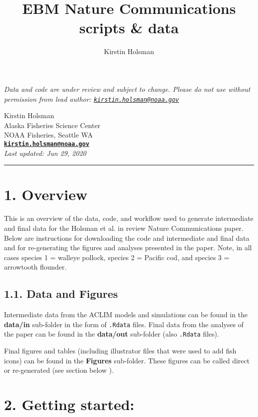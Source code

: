 \documentclass[]{article}
\title{EBM Nature Communications scripts \& data}
\author{Kirstin Holsman}
\date{}
\begin{document}
\maketitle

\emph{Data and code are under review and subject to change. Please do
not use without permission from lead author:
\href{mailto:kirstin.holsman@noaa.gov}{\nolinkurl{kirstin.holsman@noaa.gov}}}

Kirstin Holsman\\
Alaska Fisheries Science Center\\
NOAA Fisheries, Seattle WA\\
\textbf{\href{mailto:kirstin.holsman@noaa.gov}{\nolinkurl{kirstin.holsman@noaa.gov}}}\\
\emph{Last updated: Jun 29, 2020}

\begin{center}\rule{0.5\linewidth}{0.5pt}\end{center}

\section{1. Overview}\label{overview}

This is an overview of the data, code, and workflow used to generate
intermediate and final data for the Holsman et al. in review Nature
Communications paper. Below are instructions for downloading the code
and intermediate and final data and for re-generating the figures and
analyses presented in the paper. Note, in all cases species 1 = walleye
pollock, species 2 = Pacific cod, and species 3 = arrowtooth flounder.

\subsection{1.1. Data and Figures}\label{data-and-figures}

Intermediate data from the ACLIM models and simulations can be found in
the \textbf{data/in} sub-folder in the form of \texttt{.Rdata} files.
Final data from the analyses of the paper can be found in the
\textbf{data/out} sub-folder (also \texttt{.Rdata} files).

Final figures and tables (including illustrator files that were used to
add fish icons) can be found in the \textbf{Figures} sub-folder. These
figures can be called direct or re-generated (see section below ).

\section{2. Getting started:}\label{getting-started}
\end{document}
